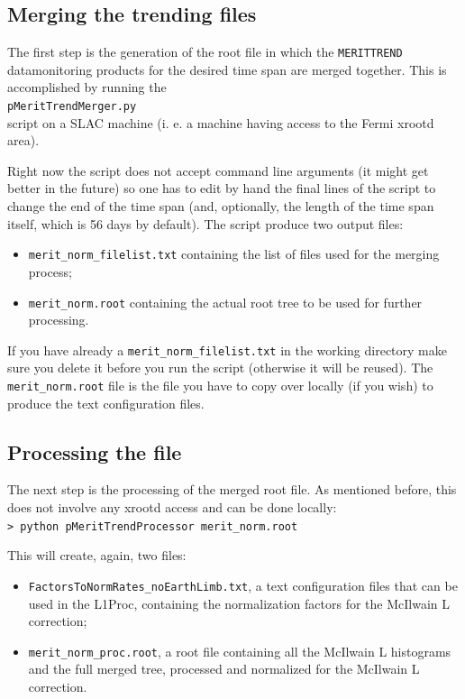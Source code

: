 \documentclass[a4paper,twocolumn]{article}
\begin{document}
\subsection{Merging the trending files}

The first step is the generation of the root file in which the
\texttt{MERITTREND} datamonitoring products for the desired time span
are merged together. This is accomplished by running the\\
\texttt{\small pMeritTrendMerger.py}\\
script on a SLAC machine (i. e. a machine having access to the Fermi
xrootd area).

Right now the script does not accept command line arguments (it might get
better in the future) so one has to edit by hand the final lines of the
script to change the end of the time span (and, optionally, the length of the
time span itself, which is 56 days by default). The script produce two output
files:
\begin{itemize}
  \item \texttt{merit\_norm\_filelist.txt} containing the list of files used
    for the merging process;
  \item \texttt{merit\_norm.root} containing the actual root tree to be used
    for further processing.
\end{itemize}
If you have already a \texttt{merit\_norm\_filelist.txt} in the working
directory make sure you delete it before you run the script (otherwise it will
be reused). The \texttt{merit\_norm.root} file is the file you have to copy over
locally (if you wish) to produce the text configuration files.

\subsection{Processing the file}

The next step is the processing of the merged root file. As mentioned before,
this does not involve any xrootd access and can be done locally:\\
\texttt{> python pMeritTrendProcessor merit\_norm.root}

\noindent This will create, again, two files:
\begin{itemize}
  \item \texttt{FactorsToNormRates\_noEarthLimb.txt}, a text configuration
    files that can be used in the L1Proc, containing the normalization
    factors for the McIlwain L correction;
  \item \texttt{merit\_norm\_proc.root}, a root file containing all the
    McIlwain L histograms and the full merged tree, processed and normalized
    for the McIlwain L correction.
\end{itemize}
\end{document}

